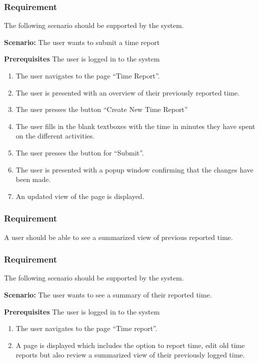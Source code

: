 \documentclass{article}
\begin{document}
\subsubsection{Requirement}
The following scenario should be supported by the system.

\textbf{Scenario:} The user wants to submit a time report

\textbf{Prerequisites} The user is logged in to the system

\begin{enumerate}


\item The user navigates to the page “Time Report”. 
\item The user is presented with an overview of their previously reported time. 
\item The user presses the button “Create New Time Report”
\item The user fills in the blank textboxes with the time in minutes they have spent on the different activities.
\item The user presses the button for “Submit”.
\item The user is presented with a popup window confirming that the changes have been made.
\item An updated view of the page is displayed.
\end{enumerate}

\subsubsection{Requirement}
A user should be able to see a summarized view of previous reported time.

\subsubsection{Requirement}
The following scenario should be supported by the system.

\textbf{Scenario:} The user wants to see a summary of their reported time.

\textbf{Prerequisites} The user is logged in to the system
\begin{enumerate}


\item The user navigates to the page “Time report”.
\item A page is displayed which includes the option to report time, edit old time reports but also review a summarized view of their previously logged time. 
\end{enumerate}
\end{document}
